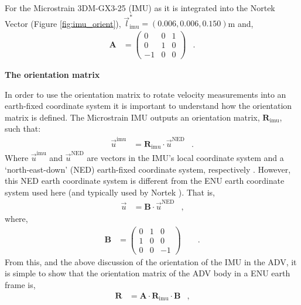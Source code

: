 \documentclass[twocol]{ametsoc}
\def\ihv{\ensuremath{\vec{l}^*_\mathrm{imu}}}
\def\dolfyn{DOLfYN}
\def\omat{\ensuremath{\mathbf{R}}}
\def\omatinv{\ensuremath{\mathbf{R}^\mathrm{T}}}
\begin{document}
For the Microstrain 3DM-GX3-25 (IMU) as it is integrated into the Nortek Vector (Figure \ref{fig:imu_orient}), $\ihv = (0.006, 0.006, 0.150)$m and,
\begin{align*}
  \mathbf{A} &=
  \left (
    \begin{array}{ccc}
      0 & 0 & 1 \\
      0 & 1 & 0 \\
      -1 & 0 & 0
    \end{array}
  \right ) & .
\end{align*}


{\bf The orientation matrix}
\def\omatr{\ensuremath{\mathrm{\mathbf{R_\mathrm{imu}}}}}

In order to use the orientation matrix to rotate velocity measurements into an earth-fixed coordinate system it is important to understand how the orientation matrix is defined. The Microstrain IMU outputs an orientation matrix, \omatr, such that:
\begin{align*}
  \vec{u}^\mathrm{imu} & = \omatr \cdot \vec{u}^\mathrm{NED} & .
\end{align*}
Where $\vec{u}^\mathrm{imu}$ and $\vec{u}^\mathrm{NED}$ are vectors in the IMU's local coordinate system and a `north-east-down' (NED) earth-fixed coordinate system, respectively \cite[]{Microstrain2012a}.  
However, this NED earth coordinate system is different from the ENU earth coordinate system used here (and typically used by Nortek \cite[]{nortek_sys_int_manual2011}).  That is,
\begin{align*}
  \vec{u} &= \mathbf{B} \cdot \vec{u}^\mathrm{NED} & ,
\end{align*}
where,
\begin{align*}
  \mathbf{B} & = 
  \left (
    \begin{array}{ccc}
      0 & 1 & 0 \\
      1 & 0 & 0 \\
      0 & 0 & -1
    \end{array}
  \right ) \qquad .
\end{align*}
From this, and the above discussion of the orientation of the IMU in the ADV, it is simple to show that the orientation matrix of the ADV body in a ENU earth frame is,
\begin{align*}
  \omat &= \mathbf{A} \cdot \omatr \cdot \mathbf{B} & ,
\end{align*}





\end{document}
